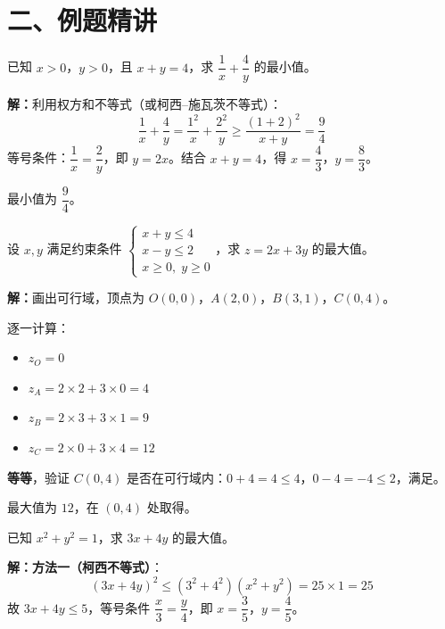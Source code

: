 \documentclass[12pt, a4paper]{ctexart}
\begin{document}
\section*{\textcolor{examorange}{二、例题精讲}}

\begin{examplebox}
已知 $x > 0$，$y > 0$，且 $x + y = 4$，求 $\dfrac{1}{x} + \dfrac{4}{y}$ 的最小值。
\end{examplebox}

\textbf{解：}利用权方和不等式（或柯西--施瓦茨不等式）：
\[ \frac{1}{x} + \frac{4}{y} = \frac{1^2}{x} + \frac{2^2}{y} \ge \frac{(1+2)^2}{x+y} = \frac{9}{4} \]
等号条件：$\dfrac{1}{x} = \dfrac{2}{y}$，即 $y = 2x$。结合 $x + y = 4$，得 $x = \dfrac{4}{3}$，$y = \dfrac{8}{3}$。

最小值为 $\boxed{\dfrac{9}{4}}$。

\begin{examplebox}
设 $x, y$ 满足约束条件 $\begin{cases} x + y \le 4 \\ x - y \le 2 \\ x \ge 0,\; y \ge 0 \end{cases}$，求 $z = 2x + 3y$ 的最大值。
\end{examplebox}

\textbf{解：}画出可行域，顶点为 $O(0, 0)$，$A(2, 0)$，$B(3, 1)$，$C(0, 4)$。

逐一计算：
\begin{itemize}
  \item $z_O = 0$
  \item $z_A = 2 \times 2 + 3 \times 0 = 4$
  \item $z_B = 2 \times 3 + 3 \times 1 = 9$
  \item $z_C = 2 \times 0 + 3 \times 4 = 12$
\end{itemize}

\textbf{等等}，验证 $C(0, 4)$ 是否在可行域内：$0 + 4 = 4 \le 4$，$0 - 4 = -4 \le 2$，满足。

最大值为 $\boxed{12}$，在 $(0, 4)$ 处取得。

\begin{examplebox}
已知 $x^2 + y^2 = 1$，求 $3x + 4y$ 的最大值。
\end{examplebox}

\textbf{解：}\textbf{方法一（柯西不等式）}：
\[ (3x + 4y)^2 \le (3^2 + 4^2)(x^2 + y^2) = 25 \times 1 = 25 \]
故 $3x + 4y \le 5$，等号条件 $\dfrac{x}{3} = \dfrac{y}{4}$，即 $x = \dfrac{3}{5}$，$y = \dfrac{4}{5}$。
\end{document}
